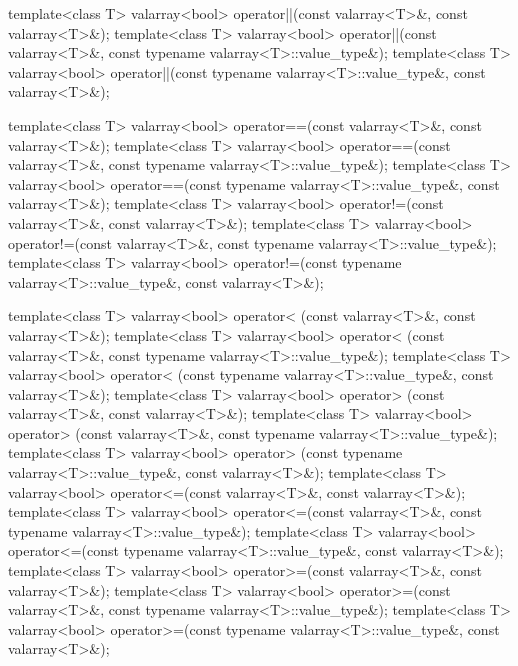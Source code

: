 \begin{codeblock}
{  template<class T> valarray<bool> operator||(const valarray<T>&, const valarray<T>&);
  template<class T> valarray<bool> operator||(const valarray<T>&,
                                              const typename valarray<T>::value_type&);
  template<class T> valarray<bool> operator||(const typename valarray<T>::value_type&,
                                              const valarray<T>&);

  template<class T> valarray<bool> operator==(const valarray<T>&, const valarray<T>&);
  template<class T> valarray<bool> operator==(const valarray<T>&,
                                              const typename valarray<T>::value_type&);
  template<class T> valarray<bool> operator==(const typename valarray<T>::value_type&,
                                              const valarray<T>&);
  template<class T> valarray<bool> operator!=(const valarray<T>&, const valarray<T>&);
  template<class T> valarray<bool> operator!=(const valarray<T>&,
                                              const typename valarray<T>::value_type&);
  template<class T> valarray<bool> operator!=(const typename valarray<T>::value_type&,
                                              const valarray<T>&);

  template<class T> valarray<bool> operator< (const valarray<T>&, const valarray<T>&);
  template<class T> valarray<bool> operator< (const valarray<T>&,
                                              const typename valarray<T>::value_type&);
  template<class T> valarray<bool> operator< (const typename valarray<T>::value_type&,
                                              const valarray<T>&);
  template<class T> valarray<bool> operator> (const valarray<T>&, const valarray<T>&);
  template<class T> valarray<bool> operator> (const valarray<T>&,
                                              const typename valarray<T>::value_type&);
  template<class T> valarray<bool> operator> (const typename valarray<T>::value_type&,
                                              const valarray<T>&);
  template<class T> valarray<bool> operator<=(const valarray<T>&, const valarray<T>&);
  template<class T> valarray<bool> operator<=(const valarray<T>&,
                                              const typename valarray<T>::value_type&);
  template<class T> valarray<bool> operator<=(const typename valarray<T>::value_type&,
                                              const valarray<T>&);
  template<class T> valarray<bool> operator>=(const valarray<T>&, const valarray<T>&);
  template<class T> valarray<bool> operator>=(const valarray<T>&,
                                              const typename valarray<T>::value_type&);
  template<class T> valarray<bool> operator>=(const typename valarray<T>::value_type&,
                                              const valarray<T>&);

}
\end{codeblock}
